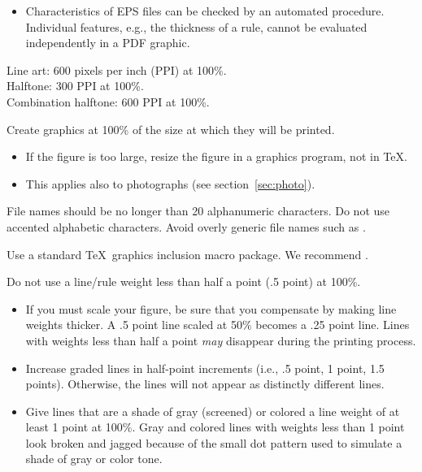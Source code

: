 \begin{itemize}
\item Characteristics of EPS files can be checked by an automated
 procedure.  Individual features, e.g., the thickness of a rule, cannot
 be evaluated independently in a PDF graphic.
\end{itemize}

%
{Line art: 600 pixels per inch (PPI) at 100\%.\\
Halftone: 300 PPI at 100\%.\\
Combination halftone: 600 PPI at 100\%.}

%
{Create graphics at 100\% of the size at which they will be printed.}

\begin{itemize}
\item If the figure is too large, resize the figure in a graphics program,
  not in \TeX.
\item This applies also to photographs (see section~\ref{sec:photo}).
\end{itemize}

%
{File names should be no longer than 20 alphanumeric characters. Do
  not use accented alphabetic characters. Avoid overly generic file
  names such as .}

%
{Use a standard \TeX\ graphics inclusion macro package.
We recommend .} 

%
{Do not use a line/rule weight less than half a point (.5 point) at 100\%.} 

\begin{itemize}
\item %
 If you must scale your figure, be sure that you compensate by making line
 weights thicker.  A .5 point line scaled at 50\% becomes a .25 point line.
 Lines with weights less than half a point \emph{may} disappear during the
 printing process.
\item Increase graded lines in half-point increments
 (i.e., .5 point, 1 point, 1.5 points).  Otherwise, the lines will not
 appear as distinctly different lines.
\item Give lines that are a shade of gray (screened) or colored a line
  weight of at least 1 point at 100\%.  Gray and colored lines with weights
  less than 1 point look broken and jagged because of the small dot pattern
  used to simulate a shade of gray or color tone.
\end{itemize}


